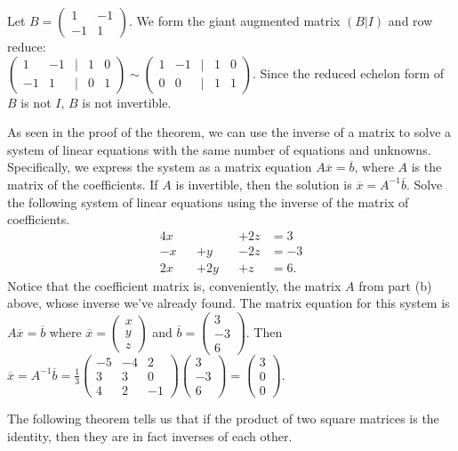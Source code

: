 \documentclass[12pt]{article}
\def\it{\item}
\def\bar#1{\overline{#1}}
\def\Frac#1#2{\displaystyle{\frac{#1}{#2}}}
\def\colll#1#2#3{\begin{pmatrix} #1 \\ #2 \\ #3 \end{pmatrix}}
\begin{document}
\it Let $B = \begin{pmatrix} 1 & -1 \\ -1 & 1 \end{pmatrix}$. We form the giant augmented matrix $(B | I)$ and row reduce: \\
$\begin{pmatrix} 1 & -1 & | & 1 & 0 \\ 
               -1 & 1  & | & 0 & 1  \end{pmatrix} \sim
\begin{pmatrix} 1 & -1 & | & 1 & 0 \\ 
                0 &  0 & | & 1 & 1  \end{pmatrix}$. 
Since the reduced echelon form of $B$ is not $I$, $B$ is not invertible.
\ee

\it As seen in the proof of the theorem, we can use the inverse of a matrix to solve a system of linear equations with the same number of equations and unknowns.
	Specifically, we express the system as a matrix equation $A\bar{x} = \bar{b}$, where $A$ is the matrix of the coefficients. If $A$ is invertible, then the
	solution is $\bar{x} = A^{-1}\bar{b}$. Solve the following system of linear equations using the inverse of the matrix of coefficients.
\begin{alignat*}{4}
x  &&  &&+2z &= 3 \\
-x &&+y &&- 2z &= -3 \\
2x &&+2y &&+ z &= 6.
\end{alignat*}
Notice that the coefficient matrix is, conveniently, the matrix $A$ from part (b) above, whose inverse we've already found. The matrix equation for this system is 
$A\bar{x} = \bar{b}$ where $\bar{x} = \colll{x}{y}{z}$ and $\bar{b} = \colll{3}{-3}{6}$. Then $\bar{x} = A^{-1}\bar{b} = 
\Frac{1}{3} \begin{pmatrix} -5 & -4 & 2 \\ 3 & 3 & 0 \\ 4 & 2 & -1 \end{pmatrix} \colll{3}{-3}{6} = \colll{3}{0}{0}$.
\ee

The following theorem tells us that if the product of two square matrices is the identity, then they are in fact inverses of each other.
\end{document}

